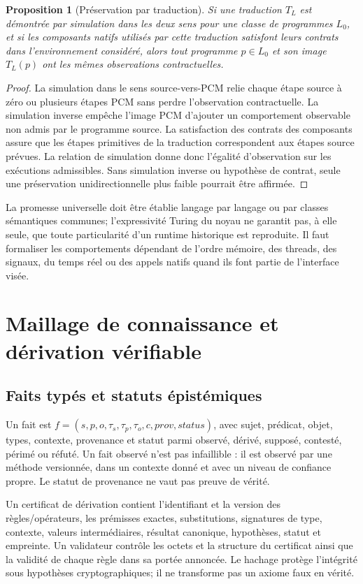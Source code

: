 \documentclass[11pt,a4paper,openany]{book}
\theoremstyle{definition}
\theoremstyle{plain}
\newtheorem{proposition}[definition]{Proposition}
\theoremstyle{remark}
\begin{document}
\begin{proposition}[Préservation par traduction]
Si une traduction $T_L$ est démontrée par simulation dans les deux sens pour une classe de programmes $L_0$, et si les composants natifs utilisés par cette traduction satisfont leurs contrats dans l'environnement considéré, alors tout programme $p\in L_0$ et son image $T_L(p)$ ont les mêmes observations contractuelles.
\end{proposition}
\begin{proof}
La simulation dans le sens source-vers-PCM relie chaque étape source à zéro ou plusieurs étapes PCM sans perdre l'observation contractuelle. La simulation inverse empêche l'image PCM d'ajouter un comportement observable non admis par le programme source. La satisfaction des contrats des composants assure que les étapes primitives de la traduction correspondent aux étapes source prévues. La relation de simulation donne donc l'égalité d'observation sur les exécutions admissibles. Sans simulation inverse ou hypothèse de contrat, seule une préservation unidirectionnelle plus faible pourrait être affirmée.
\end{proof}

La promesse universelle doit être établie langage par langage ou par classes sémantiques communes; l'expressivité Turing du noyau ne garantit pas, à elle seule, que toute particularité d'un runtime historique est reproduite. Il faut formaliser les comportements dépendant de l'ordre mémoire, des threads, des signaux, du temps réel ou des appels natifs quand ils font partie de l'interface visée.

\chapter{Maillage de connaissance et dérivation vérifiable}
\section{Faits typés et statuts épistémiques}
Un fait est $f=(s,p,o,\tau_s,\tau_p,\tau_o,c,prov,status)$, avec sujet, prédicat, objet, types, contexte, provenance et statut parmi observé, dérivé, supposé, contesté, périmé ou réfuté. Un fait observé n'est pas infaillible : il est observé par une méthode versionnée, dans un contexte donné et avec un niveau de confiance propre. Le statut de provenance ne vaut pas preuve de vérité.

Un certificat de dérivation contient l'identifiant et la version des règles/opérateurs, les prémisses exactes, substitutions, signatures de type, contexte, valeurs intermédiaires, résultat canonique, hypothèses, statut et empreinte. Un validateur contrôle les octets et la structure du certificat ainsi que la validité de chaque règle dans sa portée annoncée. Le hachage protège l'intégrité sous hypothèses cryptographiques; il ne transforme pas un axiome faux en vérité.
\end{document}
